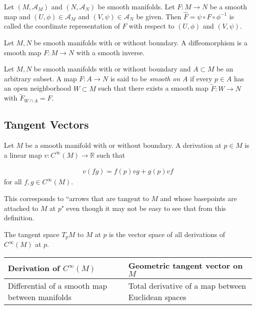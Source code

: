 \begin{defn}
  Let $(M, \mathcal{A}_M)$ and $(N, \mathcal{A}_N)$ be smooth manifolds.
  Let $F: M \rightarrow N$ be a smooth map and $(U, \phi) \in \mathcal{A}_M$ and $(V, \psi) \in \mathcal{A}_N$ be given.
  Then $\hat{F} = \psi \circ F \circ \phi^{-1}$ is called the coordinate representation of $F$ with respect to $(U, \phi)$ and $(V, \psi)$.
\end{defn}

\begin{defn}[Diffeomorphism]
  Let $M, N$ be smooth manifolds with or without boundary.
  A diffeomorphism is a smooth map $F: M \rightarrow N$ with a smooth inverse.
\end{defn}

\begin{defn}
  Let $M, N$ be smooth manifolds with or without boundary and $A \subset M$ be an arbitrary subset.
  A map $F: A \rightarrow N$ is said to be \textit{smooth on $A$} if every $p \in A$ has an open neighborhood $W \subset M$ such that there exists a smooth map $\tilde{F}:W \rightarrow N$ with $\tilde{F}_{W \cap A} = F$.
\end{defn} 

\subsection{Tangent Vectors}

\begin{defn}[Derivation]
  Let $M$ be a smooth manifold with or without boundary.
  A derivation at $p \in M$ is a linear map $v: C^{\infty}(M) \rightarrow \mathbb{R}$ such that 

  \begin{align*}
    v(fg) = f(p)vg + g(p)vf
  \end{align*}
  for all $f, g \in C^{\infty}(M)$.

  This corresponds to ``arrows that are tangent to $M$ and whose basepoints are attached to $M$ at $p$" even though it may not be easy to see that from this definition.
\end{defn}

\begin{defn}
  The tangent space $T_pM$ to $M$ at $p$ is the vector space of all derivations of $C^{\infty}(M)$ at $p$.
\end{defn}

\begin{center}
  \begin{tabular}{ | l | l | }
    \hline
    Derivation of $C^{\infty}(M)$ & Geometric tangent vector on $M$ \\ \hline
    Differential of a smooth map between manifolds & Total derivative of a map between Euclidean spaces \\ \hline
  \end{tabular}
\end{center}

